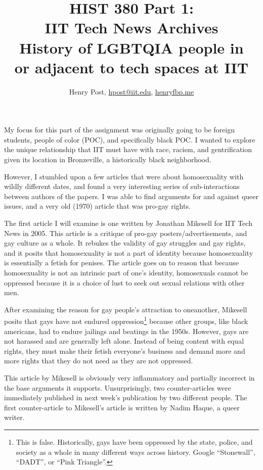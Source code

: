 \documentclass[a4paper,12pt]{article}
\title{HIST 380 Part 1: \\ IIT Tech News Archives \\ History of LGBTQIA people in \\ or adjacent to tech spaces at IIT}
\author{Henry Post, \url{hpost@iit.edu}, \url{henryfbp.me}}
\begin{document}
\maketitle

\newpage
\doublespacing

	My focus for this part of the assignment was originally going to be foreign students, people of color (POC), and specifically black POC. I wanted to explore the unique relationship that IIT must have with race, racism, and gentrification given its location in Bronzeville, a historically black neighborhood. 

	However, I stumbled upon a few articles that were about homosexuality with wildly different dates, and found a very interesting series of sub-interactions between authors of the papers. I was able to find arguments for and against queer issues, and a very old (1970) article that was pro-gay rights.

	The first article \cite{antigay} I will examine is one written by Jonathan Mikesell for IIT Tech News in 2005. This article is a critique of pro-gay posters/advertisements, and gay culture as a whole. It rebukes the validity of gay struggles and gay rights, and it posits that homosexuality is not a part of identity because homosexuality is essentially a fetish for penises. The article goes on to reason that because homosexuality is not an intrinsic part of one's identity, homosexuals cannot be oppressed because it is a choice of lust to seek out sexual relations with other men.

	After examining the reason for gay people's attraction to oneanother, Mikesell posits that gays have not endured oppression\footnote{This is false. Historically, gays have been oppressed by the state, police, and society as a whole in many different ways across history. Google ``Stonewall'', ``DADT'', or ``Pink Triangle''.} because other groups, like black americans, had to endure jailings and beatings in the 1950s. However, gays are not harassed and are generally left alone. Instead of being content with equal rights, they must make their fetish everyone's business and demand more and more rights that they do not need as they are not oppressed.
	
	This article by Mikesell is obviously very inflammatory and partially incorrect in the base arguments it supports. Unsurprisingly, two counter-articles were immediately published in next week's publication by two different people.  The first counter-article to Mikesell's article is written by Nadim Haque\cite{counterantigay1}, a queer writer. 
	
\end{document}
